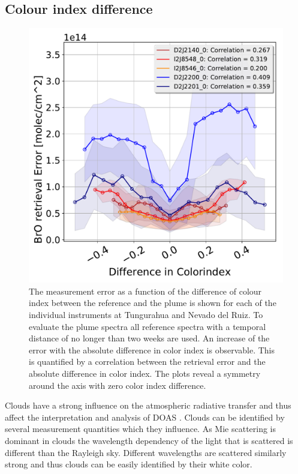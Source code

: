 \subsection{ Colour index difference}
\begin{figure}[h!]
    \centering
    \includegraphics[width=0.7\linewidth]{Bilder/DiffColidxallInstruments}
    \caption[The  measurement error as a function of the difference of colour index between the reference and the plume is shown for each of the individual instruments at Tungurahua and Nevado del Ruiz.]{The  measurement error as a function of the difference of colour index between the reference and the plume is shown for each of the individual instruments at Tungurahua and Nevado del Ruiz. To evaluate the plume spectra all reference spectra with a temporal distance of no longer than two weeks are used. An increase of the  error with the absolute difference in color index is observable. This is quantified by a correlation between the  retrieval error and the absolute difference in color index. The plots reveal a symmetry around the axis with zero color index difference. }
    \label{fig:diffcolidx}
\end{figure}
Clouds have a strong influence on the atmospheric radiative transfer and thus affect the interpretation and analysis of DOAS \citep{wagner2014cloud}.
Clouds can be identified by several measurement quantities which they influence.
As Mie scattering is dominant in clouds the wavelength dependency of the light that is scattered is different than the Rayleigh sky. Different wavelengths are scattered similarly strong and thus clouds can be easily identified by their white color.
